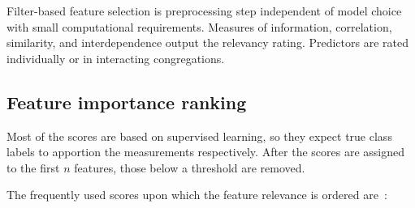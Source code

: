 Filter-based feature selection is preprocessing step independent of model choice with small computational requirements. Measures of information, correlation, similarity, and interdependence output the relevancy rating. Predictors are rated individually or in interacting congregations.

\subsection{Feature importance ranking}
Most of the scores are based on supervised learning, so they expect true class labels to apportion the measurements respectively. After the scores are assigned to the first $n$ features, those below a threshold are removed.

The frequently used scores upon which the feature relevance is ordered are~\cite{nandi_condition_2019}:

